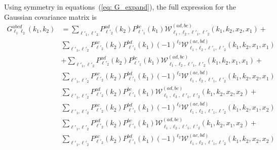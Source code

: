 \documentclass[a4paper,11pt]{article}
\begin{document}
Using symmetry in equations~(\ref{eq: G_expand}), the full expression for the Gaussian covariance matrix is 
\begin{align}
    G_{\ell_1 \ell_2}^{a b c d}(k_1, k_2) &= \sum_{\ell'_1, \ell'_2} P^{ad}_{\ell'_2}(k_2) P^{bc}_{\ell'_1}(k_1) \mathcal{W}^{(ad, bc)}_{\ell_1, \ell_2, \ell'_1, \ell'_2}(k_1, k_2, x_2, x_1) + \nonumber \\
    &\sum_{\ell'_1, \ell'_2} P^{ac}_{\ell'_2}(k_2) P^{bd}_{\ell'_1}(k_1) (-1)^{\ell_2}\mathcal{W}^{(ac, bd)}_{\ell_1, \ell_2, \ell'_1, \ell'_2}(k_1, k_2, x_1, x_1) \nonumber \\
    &+\sum_{\ell'_1, \ell'_2} P^{ad}_{\ell'_2}(k_2) P^{bc}_{\ell'_1}(k_1) \mathcal{W}^{(ad, bc)}_{\ell_1, \ell_2, \ell'_1, \ell'_2}(k_1, k_2, x_1, x_1) + \nonumber \\
    &\sum_{\ell'_1, \ell'_2} P^{ac}_{\ell'_2}(k_2) P^{bd}_{\ell'_1}(k_1) (-1)^{\ell_2}\mathcal{W}^{(ac, bd)}_{\ell_1, \ell_2, \ell'_1, \ell'_2}(k_1, k_2, x_2, x_1) \nonumber \\
    &\sum_{\ell'_1, \ell'_2} P^{ad}_{\ell'_2}(k_2) P^{bc}_{\ell'_1}(k_1) \mathcal{W}^{(ad, bc)}_{\ell_1, \ell_2, \ell'_1, \ell'_2}(k_1, k_2, x_2, x_2) + \nonumber \\
    &\sum_{\ell'_1, \ell'_2} P^{ac}_{\ell'_2}(k_2) P^{bd}_{\ell'_1}(k_1) (-1)^{\ell_2}\mathcal{W}^{(ac, bd)}_{\ell_1, \ell_2, \ell'_1, \ell'_2}(k_1, k_2, x_1, x_2) \nonumber \\
    &\sum_{\ell'_1, \ell'_2} P^{ad}_{\ell'_2}(k_2) P^{bc}_{\ell'_1}(k_1) \mathcal{W}^{(ad, bc)}_{\ell_1, \ell_2, \ell'_1, \ell'_2}(k_1, k_2, x_1, x_2) + \nonumber \\
    &\sum_{\ell'_1, \ell'_2} P^{ac}_{\ell'_2}(k_2) P^{bd}_{\ell'_1}(k_1) (-1)^{\ell_2}\mathcal{W}^{(ac, bd)}_{\ell_1, \ell_2, \ell'_1, \ell'_2}(k_1, k_2, x_2, x_2)
    \label{eq:G_all}
\end{align}
\end{document}
